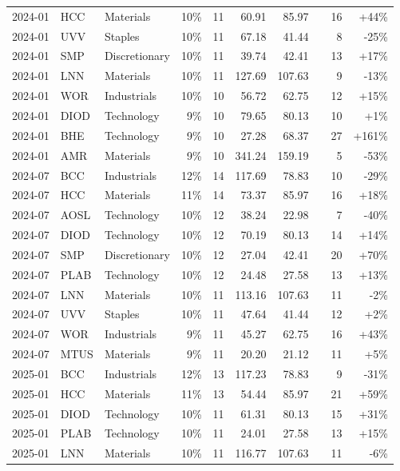 \documentclass[11pt,a4paper]{article}
\begin{document}
{\begin{longtable}{l l l r r r r r r r}
2024-01 & HCC & Materials & 10\% & 11 & 60.91 & 85.97 &  & 16 & +44\% \\
2024-01 & UVV & Staples & 10\% & 11 & 67.18 & 41.44 &  & 8 & -25\% \\
2024-01 & SMP & Discretionary & 10\% & 11 & 39.74 & 42.41 &  & 13 & +17\% \\
2024-01 & LNN & Materials & 10\% & 11 & 127.69 & 107.63 &  & 9 & -13\% \\
2024-01 & WOR & Industrials & 10\% & 10 & 56.72 & 62.75 &  & 12 & +15\% \\
2024-01 & DIOD & Technology & 9\% & 10 & 79.65 & 80.13 &  & 10 & +1\% \\
2024-01 & BHE & Technology & 9\% & 10 & 27.28 & 68.37 &  & 27 & +161\% \\
2024-01 & AMR & Materials & 9\% & 10 & 341.24 & 159.19 &  & 5 & -53\% \\
2024-07 & BCC & Industrials & 12\% & 14 & 117.69 & 78.83 &  & 10 & -29\% \\
2024-07 & HCC & Materials & 11\% & 14 & 73.37 & 85.97 &  & 16 & +18\% \\
2024-07 & AOSL & Technology & 10\% & 12 & 38.24 & 22.98 &  & 7 & -40\% \\
2024-07 & DIOD & Technology & 10\% & 12 & 70.19 & 80.13 &  & 14 & +14\% \\
2024-07 & SMP & Discretionary & 10\% & 12 & 27.04 & 42.41 &  & 20 & +70\% \\
2024-07 & PLAB & Technology & 10\% & 12 & 24.48 & 27.58 &  & 13 & +13\% \\
2024-07 & LNN & Materials & 10\% & 11 & 113.16 & 107.63 &  & 11 & -2\% \\
2024-07 & UVV & Staples & 10\% & 11 & 47.64 & 41.44 &  & 12 & +2\% \\
2024-07 & WOR & Industrials & 9\% & 11 & 45.27 & 62.75 &  & 16 & +43\% \\
2024-07 & MTUS & Materials & 9\% & 11 & 20.20 & 21.12 &  & 11 & +5\% \\
2025-01 & BCC & Industrials & 12\% & 13 & 117.23 & 78.83 &  & 9 & -31\% \\
2025-01 & HCC & Materials & 11\% & 13 & 54.44 & 85.97 &  & 21 & +59\% \\
2025-01 & DIOD & Technology & 10\% & 11 & 61.31 & 80.13 &  & 15 & +31\% \\
2025-01 & PLAB & Technology & 10\% & 11 & 24.01 & 27.58 &  & 13 & +15\% \\
2025-01 & LNN & Materials & 10\% & 11 & 116.77 & 107.63 &  & 11 & -6\% \\

\end{longtable}}
\end{document}
